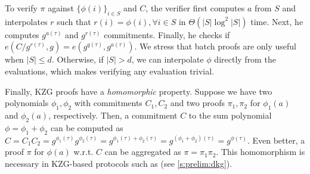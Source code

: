 To verify $\pi$ against $\{\phi(i)\}_{i\in S}$ and $C$, the verifier first computes $a$ from $S$ and interpolates $r$ such that $r(i)=\phi(i), \forall i \in S$ in $\Theta(|S|\log^2{|S|})$ time.
Next, he computes $g^{a(\tau)}$ and $g^{r(\tau)}$ commitments.
Finally, he checks if $e(C / g^{r(\tau)}, g) = e(g^{q(\tau)}, g^{a(\tau)})$.
We stress that batch proofs are only useful when $|S| \le d$.
Otherwise, if $|S| > d$, we can interpolate $\phi$ directly from the evaluations, which makes verifying any evaluation trivial.

Finally, KZG proofs have a \textit{homomorphic} property.
Suppose we have two polynomials $\phi_1, \phi_2$ with commitments $C_1,C_2$ and two proofs $\pi_1,\pi_2$ for $\phi_1(a)$ and $\phi_2(a)$, respectively.
Then, a commitment $C$ to the sum polynomial $\phi=\phi_1 + \phi_2$ can be computed as $C=C_1 C_2=g^{\phi_1(\tau)} g^{\phi_2(\tau)} = g^{\phi_1(\tau) + {\phi_2(\tau)}} = g^{(\phi_1 +\phi_2)(\tau)} = g^{\phi(\tau)}$.
Even better, a proof $\pi$ for $\phi(a)$ w.r.t. $C$ can be aggregated as $\pi = \pi_1 \pi_2$.
This homomorphism is necessary in KZG-based protocols such as \ejfdkg (see \cref{s:prelim:dkg}).

